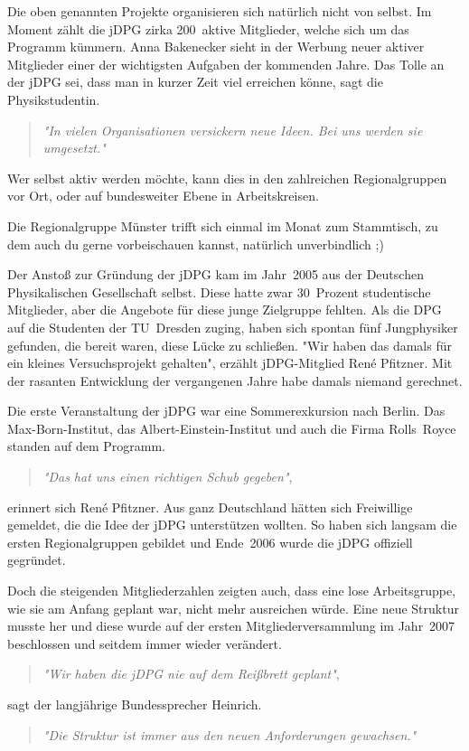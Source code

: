 \begin{multicols}{2}
Die oben genannten Projekte organisieren sich natürlich nicht von selbst.
Im Moment zählt die jDPG zirka 200~aktive Mitglieder, welche sich um das Programm kümmern.
Anna Bakenecker sieht in der Werbung neuer aktiver Mitglieder einer der wichtigsten Aufgaben der kommenden Jahre.
Das Tolle an der jDPG sei, dass man in kurzer Zeit viel erreichen könne, sagt die Physikstudentin.
\begin{quote}
	\textit{"In vielen Organisationen versickern neue Ideen.
	Bei uns werden sie umgesetzt."}
\end{quote}
Wer selbst aktiv werden möchte, kann dies in den zahlreichen Regionalgruppen vor Ort, oder auf bundesweiter Ebene in Arbeitskreisen.

Die Regionalgruppe Münster trifft sich einmal im Monat zum Stammtisch, zu dem auch du gerne vorbeischauen kannst, natürlich unverbindlich ;)

Der Anstoß zur Gründung der jDPG kam im Jahr~2005 aus der Deutschen Physikalischen Gesellschaft selbst.
Diese hatte zwar 30~Prozent studentische Mitglieder, aber die Angebote für diese junge Zielgruppe fehlten.
Als die DPG auf die Studenten der TU~Dresden zuging, haben sich spontan fünf Jungphysiker gefunden, die bereit waren, diese Lücke zu schließen.
"Wir haben das damals für ein kleines Versuchsprojekt gehalten", erzählt jDPG-Mitglied René Pfitzner.
Mit der rasanten Entwicklung der vergangenen Jahre habe damals niemand gerechnet.

Die erste Veranstaltung der jDPG war eine Sommerexkursion nach Berlin.
Das Max-Born-Institut, das Albert-Einstein-Institut und auch die Firma Rolls~Royce standen auf dem Programm.

\begin{quote}
	\textit{"Das hat uns einen richtigen Schub gegeben"},
\end{quote}
erinnert sich René Pfitzner.
Aus ganz Deutschland hätten sich Freiwillige gemeldet, die die Idee der jDPG unterstützen wollten.
So haben sich langsam die ersten Regionalgruppen gebildet und Ende~2006 wurde die jDPG offiziell gegründet.

Doch die steigenden Mitgliederzahlen zeigten auch, dass eine lose Arbeitsgruppe, wie sie am Anfang geplant war, nicht mehr ausreichen würde.
Eine neue Struktur musste her und diese wurde auf der ersten Mitgliederversammlung im Jahr~2007 beschlossen und seitdem immer wieder verändert.
\begin{quote}
	\textit{"Wir haben die jDPG nie auf dem Reißbrett geplant"},
\end{quote}
sagt der langjährige Bundessprecher Heinrich.
\begin{quote}
	\textit{"Die Struktur ist immer aus den neuen Anforderungen gewachsen."}
\end{quote}


\end{multicols}
